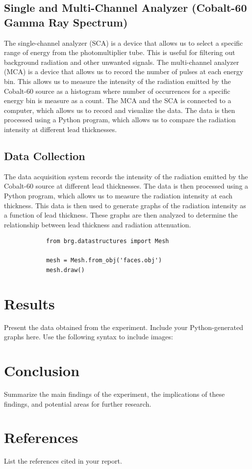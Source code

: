 \documentclass[12pt]{article}
\begin{document}
        \subsection{Single and Multi-Channel Analyzer (Cobalt-60 Gamma Ray Spectrum)}
            The single-channel analyzer (SCA) is a device that allows us to select a specific range of energy from the photomultiplier tube. 
            This is useful for filtering out background radiation and other unwanted signals. 
            The multi-channel analyzer (MCA) is a device that allows us to record the number of pulses at each energy bin. 
            This allows us to measure the intensity of the radiation emitted by the Cobalt-60 source as a histogram 
            where number of occurrences for a specific energy bin is measure as a count. 
            The MCA and the SCA is connected to a computer, which allows us to record and visualize the data. 
            The data is then processed using a Python program, which allows us to compare the radiation intensity at different lead thicknesses.
            
        \subsection{Data Collection}
            The data acquisition system records the intensity of the radiation emitted by the Cobalt-60 source at different lead thicknesses. 
            The data is then processed using a Python program, which allows us to measure the radiation intensity at each thickness. 
            This data is then used to generate graphs of the radiation intensity as a function of lead thickness. 
            These graphs are then analyzed to determine the relationship between lead thickness and radiation attenuation.
            \lstset{language=Python}
            \lstset{frame=lines}
            \lstset{basicstyle=\footnotesize}
            \begin{lstlisting}
            from brg.datastructures import Mesh
            
            mesh = Mesh.from_obj('faces.obj')
            mesh.draw()
            \end{lstlisting}
                

\section{Results}
    Present the data obtained from the experiment. Include your Python-generated graphs here. Use the following syntax to include images:
    

\section{Conclusion}
    Summarize the main findings of the experiment, the implications of these findings, and potential areas for further research.

\section{References}
    List the references cited in your report.
\end{document}
